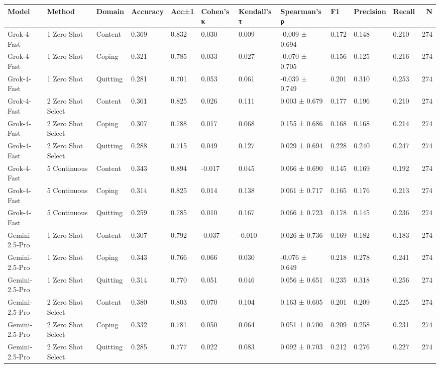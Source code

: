 \begin{tabular}{lllllllllllr}
\toprule
Model & Method & Domain & Accuracy & Acc±1 & Cohen's κ & Kendall's τ & Spearman's ρ & F1 & Precision & Recall & N \\
\midrule
Grok-4-Fast & 1 Zero Shot & Content & 0.369 & 0.832 & 0.030 & 0.009 & -0.009 ± 0.694 & 0.172 & 0.148 & 0.210 & 274 \\
Grok-4-Fast & 1 Zero Shot & Coping & 0.321 & 0.785 & 0.033 & 0.027 & -0.070 ± 0.705 & 0.156 & 0.125 & 0.216 & 274 \\
Grok-4-Fast & 1 Zero Shot & Quitting & 0.281 & 0.701 & 0.053 & 0.061 & -0.039 ± 0.749 & 0.201 & 0.310 & 0.253 & 274 \\
Grok-4-Fast & 2 Zero Shot Select & Content & 0.361 & 0.825 & 0.026 & 0.111 & 0.003 ± 0.679 & 0.177 & 0.196 & 0.210 & 274 \\
Grok-4-Fast & 2 Zero Shot Select & Coping & 0.307 & 0.788 & 0.017 & 0.068 & 0.155 ± 0.686 & 0.168 & 0.168 & 0.214 & 274 \\
Grok-4-Fast & 2 Zero Shot Select & Quitting & 0.288 & 0.715 & 0.049 & 0.127 & 0.029 ± 0.694 & 0.228 & 0.240 & 0.247 & 274 \\
Grok-4-Fast & 5 Continuous & Content & 0.343 & 0.894 & -0.017 & 0.045 & 0.066 ± 0.690 & 0.145 & 0.169 & 0.192 & 274 \\
Grok-4-Fast & 5 Continuous & Coping & 0.314 & 0.825 & 0.014 & 0.138 & 0.061 ± 0.717 & 0.165 & 0.176 & 0.213 & 274 \\
Grok-4-Fast & 5 Continuous & Quitting & 0.259 & 0.785 & 0.010 & 0.167 & 0.066 ± 0.723 & 0.178 & 0.145 & 0.236 & 274 \\
Gemini-2.5-Pro & 1 Zero Shot & Content & 0.307 & 0.792 & -0.037 & -0.010 & 0.026 ± 0.736 & 0.169 & 0.182 & 0.183 & 274 \\
Gemini-2.5-Pro & 1 Zero Shot & Coping & 0.343 & 0.766 & 0.066 & 0.030 & -0.076 ± 0.649 & 0.218 & 0.278 & 0.241 & 274 \\
Gemini-2.5-Pro & 1 Zero Shot & Quitting & 0.314 & 0.770 & 0.051 & 0.046 & 0.056 ± 0.651 & 0.235 & 0.318 & 0.256 & 274 \\
Gemini-2.5-Pro & 2 Zero Shot Select & Content & 0.380 & 0.803 & 0.070 & 0.104 & 0.163 ± 0.605 & 0.201 & 0.209 & 0.225 & 274 \\
Gemini-2.5-Pro & 2 Zero Shot Select & Coping & 0.332 & 0.781 & 0.050 & 0.064 & 0.051 ± 0.700 & 0.209 & 0.258 & 0.231 & 274 \\
Gemini-2.5-Pro & 2 Zero Shot Select & Quitting & 0.285 & 0.777 & 0.022 & 0.083 & 0.092 ± 0.703 & 0.212 & 0.276 & 0.227 & 274 \\

\end{tabular}
